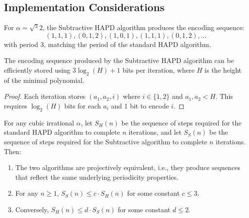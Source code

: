 \subsection{Implementation Considerations}

\begin{example}\label{ex:cube_root_implementation}
For $\alpha = \sqrt{^3}{2}$, the Subtractive HAPD algorithm produces the encoding sequence:
\begin{equation}
(1,1,1), (0,1,2), (1,0,1), (1,1,1), (0,1,2), \ldots
\end{equation}
with period 3, matching the period of the standard HAPD algorithm.
\end{example}

\begin{proposition}\label{prop:storage_efficiency}
The encoding sequence produced by the Subtractive HAPD algorithm can be efficiently stored using $3\log_2(H) + 1$ bits per iteration, where $H$ is the height of the minimal polynomial.
\end{proposition}

\begin{proof}
Each iteration stores $(a_1, a_2, i)$ where $i \in \{1,2\}$ and $a_1, a_2 < H$. This requires $\log_2(H)$ bits for each $a_i$ and 1 bit to encode $i$.
\end{proof} 

\begin{lemma}\label{lem:hapd_subtractive}
For any cubic irrational $\alpha$, let $S_H(n)$ be the sequence of steps required for the standard HAPD algorithm to complete $n$ iterations, and let $S_S(n)$ be the sequence of steps required for the Subtractive algorithm to complete $n$ iterations. Then:

\begin{enumerate}
\item The two algorithms are projectively equivalent, i.e., they produce sequences that reflect the same underlying periodicity properties.
\item For any $n \geq 1$, $S_S(n) \leq c \cdot S_H(n)$ for some constant $c \leq 3$.
\item Conversely, $S_H(n) \leq d \cdot S_S(n)$ for some constant $d \leq 2$.
\end{enumerate}
\end{lemma}

